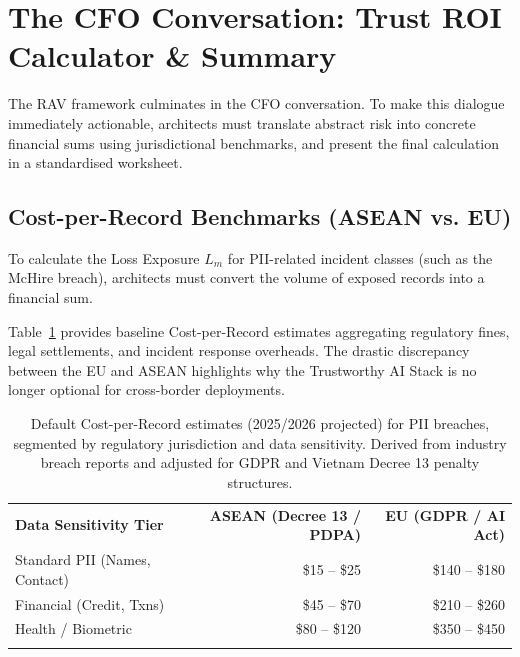 \section{The CFO Conversation: Trust ROI Calculator \& Summary}
\label{sec:cfo-summary}

The RAV framework culminates in the CFO conversation. To make this dialogue immediately actionable, architects must translate abstract risk into concrete financial sums using jurisdictional benchmarks, and present the final calculation in a standardised worksheet.

\subsection{Cost-per-Record Benchmarks (ASEAN vs. EU)}
\label{subsec:cost-per-record}

To calculate the Loss Exposure $L_m$ for PII-related incident classes (such as the McHire breach), architects must convert the volume of exposed records into a financial sum.

Table~\ref{tab:cost-per-record} provides baseline Cost-per-Record estimates aggregating regulatory fines, legal settlements, and incident response overheads. The drastic discrepancy between the EU and ASEAN highlights why the Trustworthy AI Stack is no longer optional for cross-border deployments.

\begin{table}[ht]
\centering
\caption{Default Cost-per-Record estimates (2025/2026 projected) for PII breaches, segmented by regulatory jurisdiction and data sensitivity. Derived from industry breach reports and adjusted for GDPR and Vietnam Decree 13 penalty structures.}
\label{tab:cost-per-record}
\small
\begin{tabular}{p{3.8cm}rr}
\hline\noalign{\smallskip}
\textbf{Data Sensitivity Tier}
  & \textbf{ASEAN (Decree 13 / PDPA)}
  & \textbf{EU (GDPR / AI Act)} \\
\noalign{\smallskip}\svhline\noalign{\smallskip}
Standard PII (Names, Contact) & \$15 -- \$25 & \$140 -- \$180 \\
Financial (Credit, Txns) & \$45 -- \$70 & \$210 -- \$260 \\
Health / Biometric & \$80 -- \$120 & \$350 -- \$450 \\
\noalign{\smallskip}\hline\noalign{\smallskip}
\end{tabular}
\end{table}

